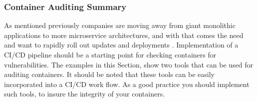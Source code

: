 \subsubsection{Container Auditing Summary}
As mentioned previously companies are moving away from giant monolithic applications to more microservice architectures, and with that comes the need and want to rapidly roll out updates and deployments \citep{neuvector_2018}. Implementation of a CI/CD pipeline should be a starting point for checking containers for vulnerabilities.
The examples in this Section, show two tools that can be used for auditing containers. It should be noted that these tools can be easily incorporated into a CI/CD work flow. As a good practice you should implement such tools, to insure the integrity of your containers.